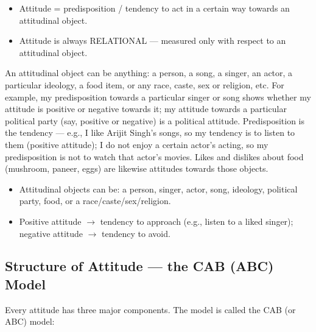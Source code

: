 \begin{KeyConcept}
\begin{itemize}
\item Attitude = predisposition / tendency to act in a certain way towards an attitudinal object.
\item Attitude is always RELATIONAL --- measured only with respect to an attitudinal object.
\end{itemize}
\end{KeyConcept}

An attitudinal object can be anything: a person, a song, a singer, an actor, a particular ideology, a food item, or any race, caste, sex or religion, etc. For example, my predisposition towards a particular singer or song shows whether my attitude is positive or negative towards it; my attitude towards a particular political party (say, positive or negative) is a political attitude. Predisposition is the tendency --- e.g., I like Arijit Singh's songs, so my tendency is to listen to them (positive attitude); I do not enjoy a certain actor's acting, so my predisposition is not to watch that actor's movies. Likes and dislikes about food (mushroom, paneer, eggs) are likewise attitudes towards those objects.

\begin{ExampleBox}
\begin{itemize}
\item Attitudinal objects can be: a person, singer, actor, song, ideology, political party, food, or a race/caste/sex/religion.
\item Positive attitude $\rightarrow$ tendency to approach (e.g., listen to a liked singer); negative attitude $\rightarrow$ tendency to avoid.
\end{itemize}
\end{ExampleBox}

\subsection{Structure of Attitude --- the CAB (ABC) Model}

Every attitude has three major components. The model is called the CAB (or ABC) model:

